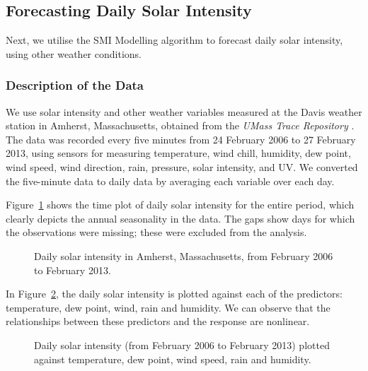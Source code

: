 \documentclass[
  11pt,
  a4paper,
]{article}
\begin{document}
\subsection{Forecasting Daily Solar Intensity}\label{sec-solar}

Next, we utilise the SMI Modelling algorithm to forecast daily solar
intensity, using other weather conditions.

\subsubsection{Description of the Data}\label{description-of-the-data-1}

We use solar intensity and other weather variables measured at the Davis
weather station in Amherst, Massachusetts, obtained from the \emph{UMass
Trace Repository} \autocite{Umass2023}. The data was recorded every five
minutes from 24 February 2006 to 27 February 2013, using sensors for
measuring temperature, wind chill, humidity, dew point, wind speed, wind
direction, rain, pressure, solar intensity, and UV. We converted the
five-minute data to daily data by averaging each variable over each day.

Figure~\ref{fig-solar} shows the time plot of daily solar intensity for
the entire period, which clearly depicts the annual seasonality in the
data. The gaps show days for which the observations were missing; these
were excluded from the analysis.

\begin{figure}


\caption{\label{fig-solar}Daily solar intensity in Amherst,
Massachusetts, from February 2006 to February 2013.}

\end{figure}%

In Figure~\ref{fig-preds}, the daily solar intensity is plotted against
each of the predictors: temperature, dew point, wind, rain and humidity.
We can observe that the relationships between these predictors and the
response are nonlinear.

\begin{figure}


\caption{\label{fig-preds}Daily solar intensity (from February 2006 to
February 2013) plotted against temperature, dew point, wind speed, rain
and humidity.}

\end{figure}%
\end{document}
